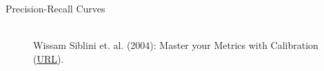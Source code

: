 \documentclass[11pt,compress,t,notes=noshow, xcolor=table]{beamer}
\begin{document}
\begin{vbframe}{Precision-Recall Curves}
\begin{footnotesize}
\end{footnotesize}


\begin{figure}
  \centering
  \tiny
  \\ Wissam Siblini et. al. (2004): Master your Metrics with Calibration 
  (\href{https://arxiv.org/pdf/1909.02827.pdf}{\underline{URL}}).
\end{figure}

% 


\end{vbframe}
\end{document}
